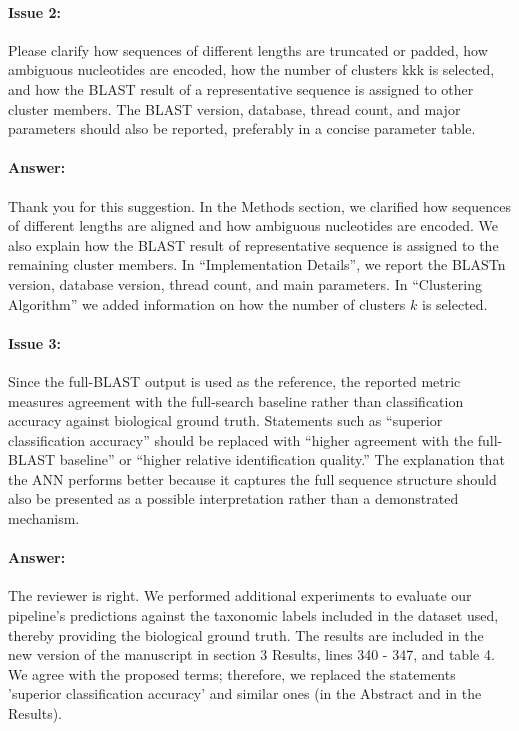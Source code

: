 \documentclass{article}
\begin{document}
\paragraph{Issue 2:}
\begin{displayquote}
Please clarify how sequences of different lengths are truncated or padded, how ambiguous nucleotides are encoded, how the number of clusters kkk is selected, and how the BLAST result of a representative sequence is assigned to other cluster members. The BLAST version, database, thread count, and major parameters should also be reported, preferably in a concise parameter table.
\end{displayquote}

\paragraph{Answer:}
Thank you for this suggestion.
In the Methods section, we clarified how sequences of different lengths are aligned and how ambiguous nucleotides are encoded.
We also explain how the BLAST result of representative sequence is assigned to the remaining cluster members. 
In ``Implementation Details'', we report the BLASTn version, database version, thread count, and main parameters.
In ``Clustering Algorithm'' we added information on how the number of clusters $k$ is selected.


\paragraph{Issue 3:}
\begin{displayquote}
Since the full-BLAST output is used as the reference, the reported metric measures agreement with the full-search baseline rather than classification accuracy against biological ground truth. Statements such as “superior classification accuracy” should be replaced with “higher agreement with the full-BLAST baseline” or “higher relative identification quality.” The explanation that the ANN performs better because it captures the full sequence structure should also be presented as a possible interpretation rather than a demonstrated mechanism.
\end{displayquote}

\paragraph{Answer:}
The reviewer is right. We performed additional experiments to evaluate our pipeline's predictions against the taxonomic labels included in the dataset used, thereby providing the biological ground truth. The results are included in the new version of the manuscript in section 3 Results, lines 340 - 347, and table 4. We agree with the proposed terms; therefore, we replaced the statements 'superior classification accuracy' and similar ones (in the Abstract and in the Results).
\end{document}
